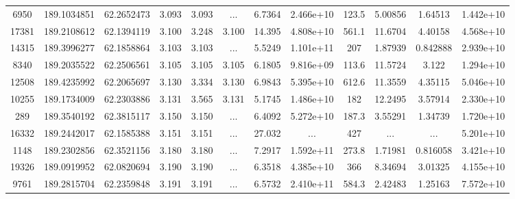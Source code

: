 \begin{table*}
\begin{tabular}{cccccccccccc}
           6950 &     189.1034851 &      62.2652473 &           3.093 &           3.093 &             ... &          6.7364 &       2.466e+10 &           123.5 &         5.00856 &         1.64513 &       1.442e+10 \\
          17381 &     189.2108612 &      62.1394119 &           3.100 &           3.248 &           3.100 &          14.395 &       4.808e+10 &           561.1 &         11.6704 &         4.40158 &       4.568e+10 \\
          14315 &     189.3996277 &      62.1858864 &           3.103 &           3.103 &             ... &          5.5249 &       1.101e+11 &             207 &         1.87939 &        0.842888 &       2.939e+10 \\
           8340 &     189.2035522 &      62.2506561 &           3.105 &           3.105 &           3.105 &          6.1805 &       9.816e+09 &           113.6 &         11.5724 &           3.122 &       1.294e+10 \\
          12508 &     189.4235992 &      62.2065697 &           3.130 &           3.334 &           3.130 &          6.9843 &       5.395e+10 &           612.6 &         11.3559 &         4.35115 &       5.046e+10 \\
          10255 &     189.1734009 &      62.2303886 &           3.131 &           3.565 &           3.131 &          5.1745 &       1.486e+10 &             182 &         12.2495 &         3.57914 &       2.330e+10 \\
            289 &     189.3540192 &      62.3815117 &           3.150 &           3.150 &             ... &          6.4092 &       5.272e+10 &           187.3 &         3.55291 &         1.34739 &       1.720e+10 \\
          16332 &     189.2442017 &      62.1585388 &           3.151 &           3.151 &             ... &          27.032 &             ... &             427 &             ... &             ... &       5.201e+10 \\
           1148 &     189.2302856 &      62.3521156 &           3.180 &           3.180 &             ... &          7.2917 &       1.592e+11 &           273.8 &         1.71981 &        0.816058 &       3.421e+10 \\
          19326 &     189.0919952 &      62.0820694 &           3.190 &           3.190 &             ... &          6.3518 &       4.385e+10 &             366 &         8.34694 &         3.01325 &       4.155e+10 \\
           9761 &     189.2815704 &      62.2359848 &           3.191 &           3.191 &             ... &          6.5732 &       2.410e+11 &           584.3 &         2.42483 &         1.25163 &       7.572e+10 \\

\end{tabular}
\end{table*}
